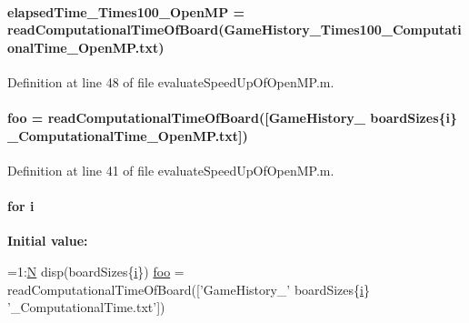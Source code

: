 \paragraph[{elapsed\+Time\+\_\+50\+Times100\+\_\+\+Open\+M\+P}]{\setlength{\rightskip}{0pt plus 5cm}elapsed\+Time\+\_\+Times100\+\_\+\+Open\+M\+P = read\+Computational\+Time\+Of\+Board(\textquotesingle{}Game\+History\+\_\+Times100\+\_\+\+Computational\+Time\+\_\+\+Open\+M\+P.\+txt\textquotesingle{})}\label{a00100_a81a8ed9e2700c8561764b5a0bf578447}


Definition at line 48 of file evaluate\+Speed\+Up\+Of\+Open\+M\+P.\+m.

\hypertarget{a00100_afdba98970961edb29f88241b9d99d890}{}
\paragraph[{foo}]{\setlength{\rightskip}{0pt plus 5cm}foo = read\+Computational\+Time\+Of\+Board(\mbox{[}\textquotesingle{}Game\+History\+\_\+\textquotesingle{} board\+Sizes\{{\bf i}\} \textquotesingle{}\+\_\+\+Computational\+Time\+\_\+\+Open\+M\+P.\+txt\textquotesingle{}\mbox{]})}\label{a00100_afdba98970961edb29f88241b9d99d890}


Definition at line 41 of file evaluate\+Speed\+Up\+Of\+Open\+M\+P.\+m.

\hypertarget{a00100_a6f6ccfcf58b31cb6412107d9d5281426}{}
\paragraph[{i}]{\setlength{\rightskip}{0pt plus 5cm}for i}\label{a00100_a6f6ccfcf58b31cb6412107d9d5281426}
{\bfseries Initial value\+:}
\begin{DoxyCode}
=1:\hyperlink{a00100_a8cc2e7240164328fdc3f0e5e21032c56}{N}
    disp(boardSizes\{\hyperlink{a00100_a6f6ccfcf58b31cb6412107d9d5281426}{i}\})
    \hyperlink{a00100_afdba98970961edb29f88241b9d99d890}{foo} = readComputationalTimeOfBoard([\textcolor{stringliteral}{'GameHistory\_'} boardSizes\{\hyperlink{a00100_a6f6ccfcf58b31cb6412107d9d5281426}{i}\} \textcolor{stringliteral}{'\_ComputationalTime.txt'}])
\end{DoxyCode}


